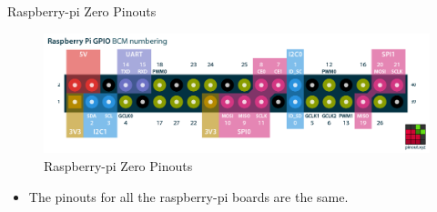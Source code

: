 \begin{frame}
   {Raspberry-pi Zero Pinouts}
   \begin{figure}[H]
      \includegraphics[width=5in]{IMAGES/raspberry-pi-pinout}
      \caption{Raspberry-pi Zero Pinouts}
   \end{figure}
   \begin{itemize}
      \item The pinouts for all the raspberry-pi boards are the same.
   \end{itemize}
\end{frame}

\cprotect{}

